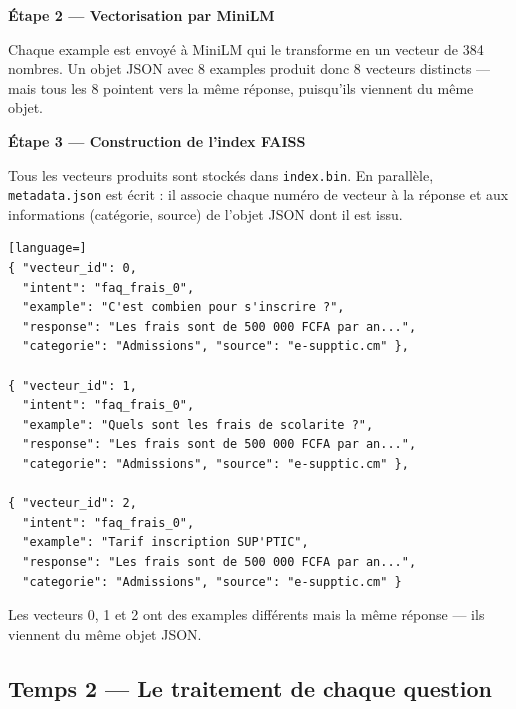 \documentclass[11pt,a4paper]{article}
\begin{document}
\vspace{0.3cm}
\textbf{Étape 2 --- Vectorisation par MiniLM}

Chaque example est envoyé à MiniLM qui le transforme en un
vecteur de 384 nombres. Un objet JSON avec 8 examples
produit donc 8 vecteurs distincts --- mais tous les 8 pointent
vers la même réponse, puisqu'ils viennent du même objet.

\vspace{0.3cm}
\textbf{Étape 3 --- Construction de l'index FAISS}

Tous les vecteurs produits sont stockés dans \texttt{index.bin}.
En parallèle, \texttt{metadata.json} est écrit : il associe
chaque numéro de vecteur à la réponse et aux informations
(catégorie, source) de l'objet JSON dont il est issu.

\begin{exemple}
\begin{lstlisting}[language=]
{ "vecteur_id": 0,
  "intent": "faq_frais_0",
  "example": "C'est combien pour s'inscrire ?",
  "response": "Les frais sont de 500 000 FCFA par an...",
  "categorie": "Admissions", "source": "e-supptic.cm" },

{ "vecteur_id": 1,
  "intent": "faq_frais_0",
  "example": "Quels sont les frais de scolarite ?",
  "response": "Les frais sont de 500 000 FCFA par an...",
  "categorie": "Admissions", "source": "e-supptic.cm" },

{ "vecteur_id": 2,
  "intent": "faq_frais_0",
  "example": "Tarif inscription SUP'PTIC",
  "response": "Les frais sont de 500 000 FCFA par an...",
  "categorie": "Admissions", "source": "e-supptic.cm" }
\end{lstlisting}
Les vecteurs 0, 1 et 2 ont des examples différents mais
la même réponse --- ils viennent du même objet JSON.
\end{exemple}

\subsection{Temps 2 --- Le traitement de chaque question}
\end{document}
